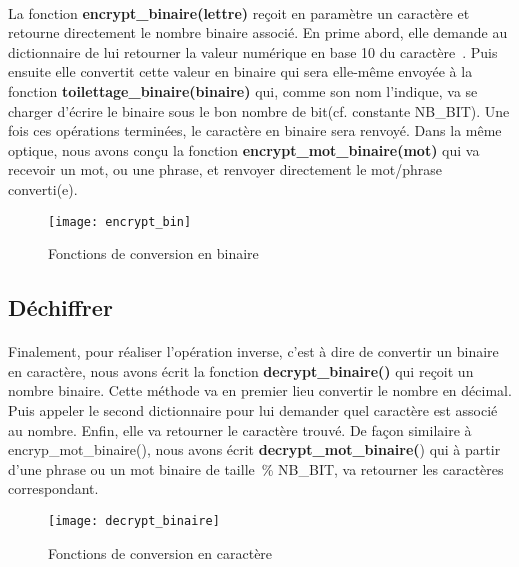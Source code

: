 \documentclass[11pt,fleqn]{book} %
\begin{document}
\paragraph{}La fonction \textbf{encrypt\_binaire(lettre)} reçoit en paramètre un caractère et retourne directement le nombre binaire associé. En prime abord, elle demande au dictionnaire de lui retourner la valeur numérique en base 10 du caractère . Puis ensuite elle convertit cette valeur en binaire qui sera elle-même envoyée à la fonction \textbf{toilettage\_binaire(binaire)} qui, comme son nom l'indique, va se charger d'écrire le binaire sous le bon nombre de bit(cf. constante NB\_BIT).
Une fois ces opérations terminées, le caractère en binaire sera renvoyé.
\vspace{0.5cm}Dans la même optique, nous avons conçu la fonction \textbf{encrypt\_mot\_binaire(mot)}  qui va recevoir un mot, ou une phrase, et renvoyer directement le mot/phrase converti(e). 

\begin{figure}[!h]
\centering\texttt{[image: encrypt\_bin]}
\caption{Fonctions de conversion en binaire}

\end{figure}


\subsection{Déchiffrer}

\paragraph{}Finalement, pour réaliser l'opération inverse, c'est à dire de convertir un binaire en caractère, nous avons écrit la fonction \textbf{decrypt\_binaire()} qui reçoit un nombre binaire. Cette méthode va en premier lieu convertir le nombre en décimal. Puis appeler le second dictionnaire pour lui demander quel caractère est associé au nombre. Enfin, elle va retourner le caractère trouvé. De façon similaire à encryp\_mot\_binaire(), nous avons écrit \textbf{decrypt\_mot\_binaire(}) qui à partir d'une phrase ou un mot binaire de taille \% NB\_BIT, va retourner les caractères correspondant.

\begin{figure}[!h]
\centering\texttt{[image: decrypt\_binaire]}
\caption{Fonctions de conversion en caractère}
\label{fig:nonfloat}
\end{figure}
\end{document}
